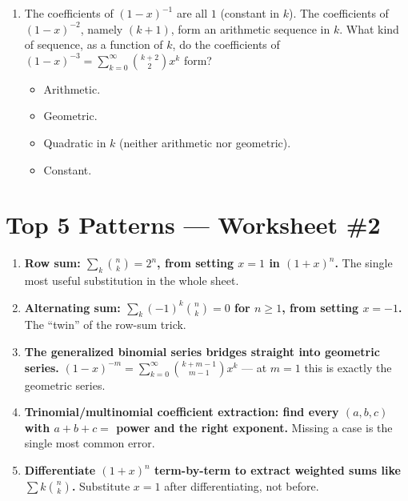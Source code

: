 \documentclass[11pt,a4paper]{article}
\begin{document}
\begin{enumerate}
\item The coefficients of $(1-x)^{-1}$ are all $1$ (constant in $k$). The coefficients of $(1-x)^{-2}$, namely $(k+1)$, form an arithmetic sequence in $k$. What kind of sequence, as a function of $k$, do the coefficients of $(1-x)^{-3}=\sum_{k=0}^\infty\binom{k+2}2x^k$ form?
\begin{itemize}
\item[A)] Arithmetic.
\item[B)] Geometric.
\item[C)] Quadratic in $k$ (neither arithmetic nor geometric).
\item[D)] Constant.
\end{itemize}


\end{enumerate}

\section*{Top 5 Patterns --- Worksheet \#2}
\begin{enumerate}[leftmargin=2em,itemsep=4pt]
  \item \textbf{Row sum: $\sum_k\binom nk=2^n$, from setting $x=1$ in $(1+x)^n$.} The single most useful substitution in the whole sheet. 
  \item \textbf{Alternating sum: $\sum_k(-1)^k\binom nk=0$ for $n\geq1$, from setting $x=-1$.} The ``twin'' of the row-sum trick. 
  \item \textbf{The generalized binomial series bridges straight into geometric series.} $(1-x)^{-m}=\sum_{k=0}^\infty\binom{k+m-1}{m-1}x^k$ --- at $m=1$ this is exactly the geometric series. 
  \item \textbf{Trinomial/multinomial coefficient extraction: find every $(a,b,c)$ with $a{+}b{+}c=$ power and the right exponent.} Missing a case is the single most common error. 
  \item \textbf{Differentiate $(1+x)^n$ term-by-term to extract weighted sums like $\sum k\binom nk$.} Substitute $x=1$ after differentiating, not before. 
\end{enumerate}
\end{document}
